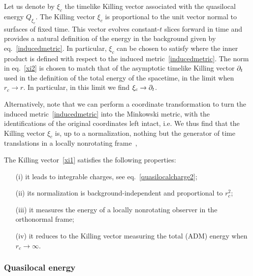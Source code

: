 \documentclass[11pt,a4paper]{article}
\begin{document}
	Let us denote by $\xi_c$ the timelike Killing vector associated with the quasilocal energy $Q_{\xi_c}$. The Killing vector $\xi_c$ is proportional to the unit vector normal to surfaces of fixed time. This vector evolves constant-$t$ slices forward in time and provides a natural definition of the energy in the background given by eq.~\eqref{inducedmetric}. In particular, $\xi_c$ can be chosen to satisfy 
	where the inner product is defined with respect to the induced metric~\eqref{inducedmetric}. The norm in eq.~\eqref{xi2} is chosen to match that of the asymptotic timelike Killing vector $\partial_t$ used in the definition of the total energy of the spacetime, in the limit when $r_c \to r$. In particular, in this limit we find $\xi_c \to \partial_t$.
	
	Alternatively, note that we can perform a coordinate transformation 
	to turn the induced metric~\eqref{inducedmetric} into the Minkowski metric,
	with the identifications of the original coordinates left intact, i.e.
	We thus find that the Killing vector $\xi_c$ is, up to a normalization, nothing but the generator of time translations in a locally nonrotating frame~\cite{Misner:1974qy},
	
	The Killing vector~\eqref{xi1} satisfies the following properties:
	 \begin{enumerate}
	 \item[(i)] it leads to integrable charges, see eq.~\eqref{quasilocalcharge2};
	 \item[(ii)] its normalization is background-independent and proportional to $r_c^2$;
	 \item[(iii)] it measures the energy of a locally nonrotating observer in the orthonormal frame;
	 \item[(iv)] it reduces to the Killing vector measuring the total (ADM) energy when $r_c \to \infty$.
	 \end{enumerate}
	
\subsubsection*{Quasilocal energy}
	
\end{document}
